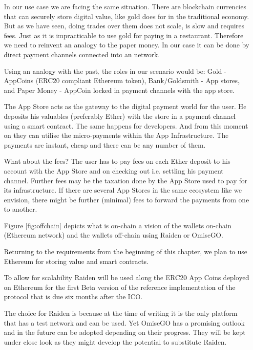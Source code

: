 In our use case we are facing the same situation. There are blockchain currencies that can securely store digital value, like gold does for in the traditional economy. But as we have seen, doing trades over them does not scale, is slow and requires fees. Just as it is impracticable to use gold for paying in a restaurant. Therefore we need to reinvent an analogy to the paper money. In our case it can be done by direct payment channels connected into an network.

Using an analogy with the past, the roles in our scenario would be:  Gold - AppCoins (ERC20 compliant Ethereum token),  Bank/Goldsmith - App stores, and Paper Money - AppCoin locked in payment channels with the app store.

The App Store acts as the gateway to the digital payment world for the user. He deposits his valuables (preferably Ether) with the store in a payment channel using a smart contract. The same happens for developers. And from this moment on they can utilise the micro-payments within the App Infrastructure. The payments are instant, cheap and there can be any number of them.

What about the fees? The user has to pay fees on each Ether deposit to his account with the App Store and on checking out i.e. settling his payment channel. Further fees may be the taxation done by the App Store used to pay for its infrastructure.  If there are several App Stores in the same ecosystem like we envision, there might be further (minimal) fees to forward the payments from one to another.

Figure \ref{fig:offchain} depicts what is on-chain a vision of the wallets on-chain (Ethereum network) and the wallets off-chain using Raiden or OmiseGO.


Returning to the requirements from the beginning of this chapter, we plan to use Ethereum for storing value and smart contracts. 

To allow for scalability Raiden will be used along the ERC20 App Coins deployed on Ethereum for the first Beta version of the reference implementation of the protocol that is due six months after the ICO. %

The choice for Raiden is because at the time of writing it is the only platform that has a test network and can be used. Yet OmiseGO has a promising outlook and in the future can be adopted depending on their progress. They will be kept under close look as they might develop the potential to substitute Raiden.


